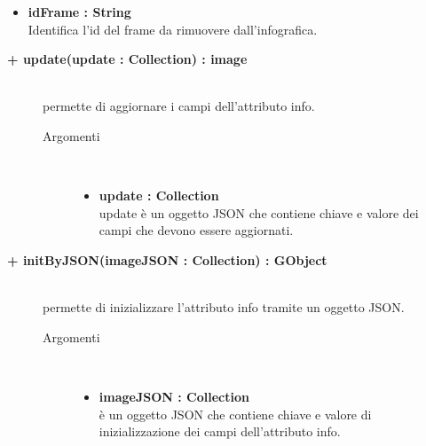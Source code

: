 \begin{description}
\begin{description}
\begin{description}
\begin{itemize}
					\item \textbf{idFrame : String			} \hfill \\
						Identifica l'id del frame da rimuovere dall'infografica.
				\end{itemize}
		\end{description}

\end{description}

\begin{description}
		\item[\textbf{\color{blue}+ update(update : Collection) : image			}] \hfill \\
			permette di aggiornare i campi dell'attributo info.
			
		\begin{description}
			\item[Argomenti] \hfill \\
				\begin{itemize}
				
					\item \textbf{update : Collection			} \hfill \\
					update è un oggetto JSON che contiene chiave e valore dei campi che devono essere aggiornati. 
				\end{itemize}
		\end{description}

\end{description}

\begin{description}
		\item[\textbf{\color{blue}+ initByJSON(imageJSON : Collection) : GObject			}] \hfill \\
			permette di inizializzare l'attributo info tramite un oggetto JSON. 
			
		\begin{description}
			\item[Argomenti] \hfill \\
				\begin{itemize}
				
					\item \textbf{imageJSON : Collection			} \hfill \\
					è un oggetto JSON che contiene chiave e valore di inizializzazione dei campi dell'attributo info. 
				\end{itemize}
		\end{description}


\end{description}
\end{description}
